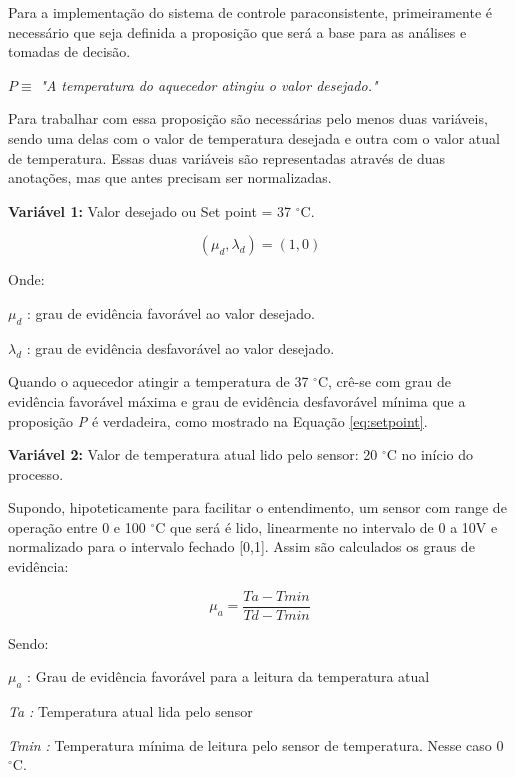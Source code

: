 Para a implementação do sistema de controle paraconsistente, primeiramente é necessário que seja definida a proposição que será a base para as análises e tomadas de decisão.

\begin{center}
$ P \equiv $ 
\emph{"A temperatura do aquecedor atingiu o valor desejado."}
\end{center}

Para trabalhar com essa proposição são necessárias pelo menos duas variáveis, sendo uma delas com o valor de temperatura desejada e outra com o valor atual de temperatura. Essas duas variáveis são representadas através de duas anotações, mas que antes precisam ser normalizadas. 

\textbf{Variável 1:} 
Valor desejado ou Set point = 37 $^{\circ}$C. 

\begin{equation}
( \mu _{d}, \lambda _{d} ) = (1,0)
\label{eq:setpoint}
\end{equation}

Onde:

$\mu _{d}$ : grau de evidência favorável ao valor desejado. 

$\lambda _{d}$ : grau de evidência desfavorável ao valor desejado.

Quando o aquecedor atingir a temperatura de 37 $^{\circ}$C, 
crê-se com grau de evidência favorável máxima e grau de evidência desfavorável mínima que a proposição \emph{P} é verdadeira, como mostrado na Equação \ref{eq:setpoint}.



\textbf{Variável 2:} 
Valor de temperatura atual lido pelo sensor: 20 $^{\circ}$C no início do processo.

Supondo, hipoteticamente para facilitar o entendimento, um sensor com range de operação entre 0 e 100 $^{\circ}$C que será é lido, linearmente no intervalo de 0 a 10V e normalizado para o intervalo fechado [0,1]. Assim são calculados os graus de evidência:

\begin{equation}
\mu _{a} = 
\frac{Ta - Tmin}{Td - Tmin}
\label{eq:miatual}
\end{equation}

Sendo:

$\mu _{a}$ : Grau de evidência favorável para a leitura da temperatura atual

\emph{Ta :} Temperatura atual lida pelo sensor

\emph{Tmin :} Temperatura mínima de leitura pelo sensor de temperatura. Nesse caso 0 $^{\circ}$C.

